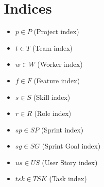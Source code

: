 \documentclass{article}
\begin{document}
\section{Indices}
\begin{itemize}
    \item $p \in P$ (Project index)
    \item $t \in T$ (Team index)
    \item $w \in W$ (Worker index)
    \item $f \in F$ (Feature index)
    \item $s \in S$ (Skill index)
    \item $r \in R$ (Role index)
    \item $sp \in SP$ (Sprint index)
    \item $sg \in SG$ (Sprint Goal index)
    \item $us \in US$ (User Story index)
    \item $tsk \in TSK$ (Task index)
\end{itemize}
\end{document}
